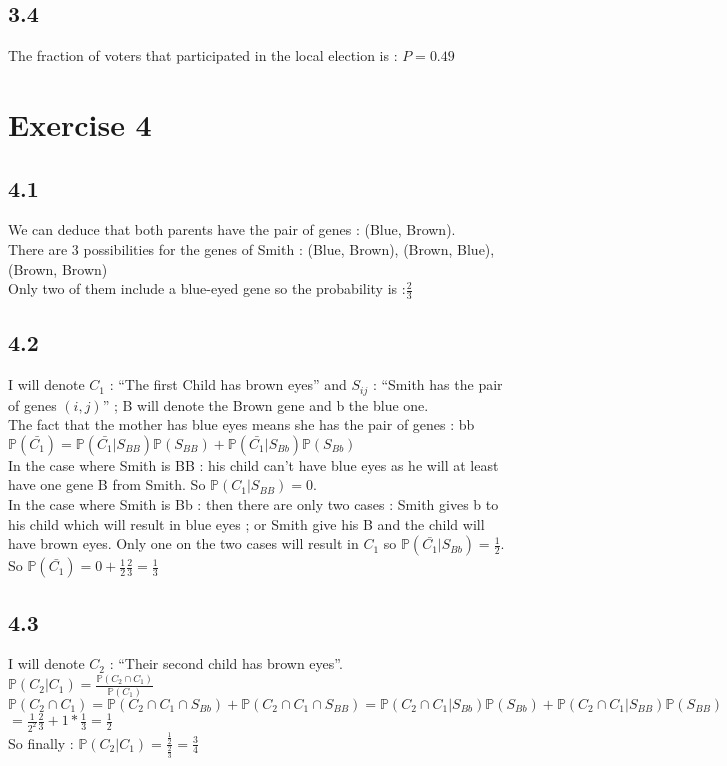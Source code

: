 \documentclass{article}
\begin{document}
    \subsection*{3.4}
    The fraction of voters that participated in the local election is : $P = 0.49$
    \section*{Exercise 4}
    \subsection*{4.1}
    We can deduce that both parents have the pair of genes : (Blue, Brown).
    \\
    There are 3 possibilities for the genes of Smith : (Blue, Brown), (Brown, Blue), (Brown, Brown)
    \\
    Only two of them include a blue-eyed gene so the probability is :$\frac{2}{3}$
    \subsection*{4.2}
    I will denote $C_1$ : ``The first Child has brown eyes'' and $S_{ij}$ : ``Smith has the pair of genes $(i,j)$'' ; B will denote the Brown gene and b the blue one.
    \\
    The fact that the mother has blue eyes means she has the pair of genes : bb
    \\
    $\mathbb{P}(\bar{C_1}) = \mathbb{P}(\bar{C_1}|S_{BB})\mathbb{P}(S_{BB})+\mathbb{P}(\bar{C_1}|S_{Bb})\mathbb{P}(S_{Bb})$
    \\
    In the case where Smith is BB : his child can't have blue eyes as he will at least have one gene B from Smith. So $\mathbb{P}(C_1|S_{BB}) = 0$.
    \\
    In the case where Smith is Bb : then there are only two cases : Smith gives b to his child which will result in blue eyes ; or Smith give his B and the child will have brown eyes.
    Only one on the two cases will result in $C_1$ so $\mathbb{P}(\bar{C_1}|S_{Bb}) = \frac{1}{2}$.
    \\
    So $\mathbb{P}(\bar{C_1}) = 0 + \frac{1}{2}\frac{2}{3} = \frac{1}{3}$
    \subsection*{4.3}
    I will denote $C_2$ : ``Their second child has brown eyes''.
    \\
    $\mathbb{P}(C_2|C_1) = \frac{\mathbb{P}(C_2\cap C_1)}{\mathbb{P}(C_1)}$
    \\
    $\mathbb{P}(C_2\cap C_1) = \mathbb{P}(C_2 \cap C_1 \cap S_{Bb}) + \mathbb{P}(C_2 \cap C_1 \cap S_{BB}) = \mathbb{P}(C_2 \cap C_1 | S_{Bb})\mathbb{P}(S_{Bb}) +\mathbb{P}(C_2 \cap C_1 | S_{BB})\mathbb{P}(S_{BB})$
    \\
    $ = \frac{1}{2^2}\frac{2}{3}+ 1*\frac{1}{3} = \frac{1}{2}$
    \\
    So finally : $\mathbb{P}(C_2|C_1) = \frac{\frac{1}{2}}{\frac{2}{3}} = \frac{3}{4}$
\end{document}
